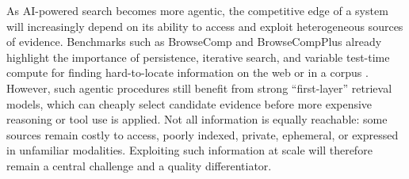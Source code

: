 As AI-powered search becomes more agentic, the competitive edge of a system will increasingly depend on its ability to access and exploit heterogeneous sources of evidence.
Benchmarks such as BrowseComp and BrowseCompPlus already highlight the importance of persistence, iterative search, and variable test-time compute for finding hard-to-locate information on the web or in a corpus . However, such agentic procedures still benefit from strong ``first-layer'' retrieval models, which can cheaply select candidate evidence before more expensive reasoning or tool use is applied.
Not all information is equally reachable: some sources remain costly to access, poorly indexed, private, ephemeral, or expressed in unfamiliar modalities. Exploiting such information at scale will therefore remain a central challenge and a quality differentiator.




